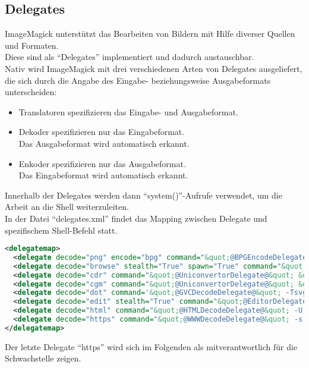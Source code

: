 \subsection{Delegates}\label{subsec:delegates}

ImageMagick unterstützt das Bearbeiten von Bildern mit Hilfe diverser Quellen und Formaten.\\
Diese sind als "`Delegates"' implementiert und dadurch austauschbar.\\

Nativ wird ImageMagick mit drei verschiedenen Arten von Delegates ausgeliefert, die sich durch die Angabe des Eingabe- beziehungsweise Ausgabeformats unterscheiden:
\begin{itemize}
    \item Translatoren spezifizieren das Eingabe- und Ausgabeformat.
    \item Dekoder spezifizieren nur das Eingabeformat.\\
    Das Ausgabeformat wird automatisch erkannt.
    \item Enkoder spezifizieren nur das Ausgabeformat.\\
    Das Eingabeformat wird automatisch erkannt.
\end{itemize}

Innerhalb der Delegates werden dann "`system()"'-Aufrufe verwendet, um die Arbeit an die Shell weiterzuleiten.\\

In der Datei "`delegates.xml"' findet das Mapping zwischen Delegate und spezifischem Shell-Befehl statt.\\

\begin{lstlisting}[language=XML, caption=/config/delegates.xml.in Auszug,label={lst:lstlisting}]
<delegatemap>
  <delegate decode="png" encode="bpg" command="&quot;@BPGEncodeDelegate@&quot; -b 12 -q %[fx:quality/2] -o &quot;%o&quot; &quot;%i&quot;"/>
  <delegate decode="browse" stealth="True" spawn="True" command="&quot;@BrowseDelegate@&quot; http://www.imagemagick.org/; rm &quot;%i&quot;"/>
  <delegate decode="cdr" command="&quot;@UniconvertorDelegate@&quot; &quot;%i&quot; &quot;%o.svg&quot;; mv &quot;%o.svg&quot; &quot;%o&quot;"/>
  <delegate decode="cgm" command="&quot;@UniconvertorDelegate@&quot; &quot;%i&quot; &quot;%o.svg&quot;; mv &quot;%o.svg&quot; &quot;%o&quot;"/>
  <delegate decode="dot" command='&quot;@GVCDecodeDelegate@&quot; -Tsvg &quot;%i&quot; -o &quot;%o&quot;' />
  <delegate decode="edit" stealth="True" command="&quot;@EditorDelegate@&quot; -title &quot;Edit Image Comment&quot; -e vi &quot;%o&quot;"/>
  <delegate decode="html" command="&quot;@HTMLDecodeDelegate@&quot; -U -o &quot;%o&quot; &quot;%i&quot;"/>
  <delegate decode="https" command="&quot;@WWWDecodeDelegate@&quot; -s -k -L -o &quot;%o&quot; &quot;https:%M&quot;"/>
</delegatemap>
\end{lstlisting}
\vspace{5mm}

Der letzte Delegate "`https"' wird sich im Folgenden als mitverantwortlich für die Schwachstelle zeigen.